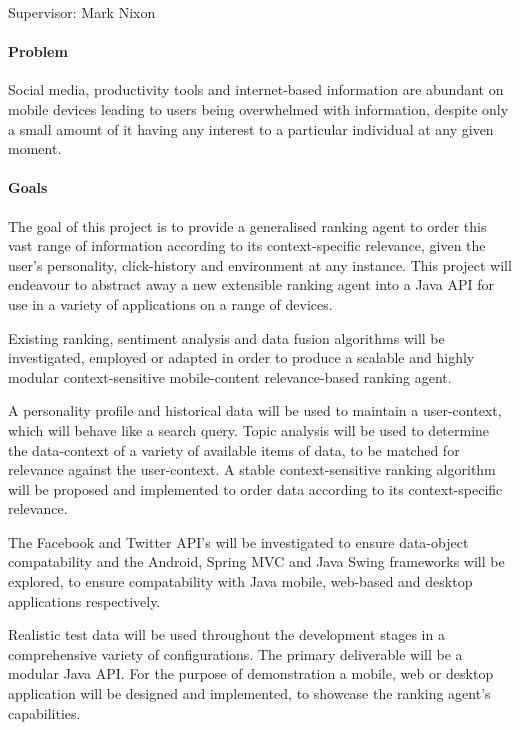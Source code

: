 \documentclass[12pt]{article}
\begin{document}
\maketitle
Supervisor: Mark Nixon

\paragraph{Problem}
Social media, productivity tools and internet-based information are abundant on mobile devices leading to users being overwhelmed with information, despite only a small amount of it having any interest to a particular individual at any given moment.

\paragraph{Goals}
The goal of this project is to provide a generalised ranking agent to order this vast range of information according to its context-specific relevance, given the user's personality, click-history and environment at any instance. This project will endeavour to abstract away a new extensible ranking agent into a Java API for use in a variety of applications on a range of devices.

Existing ranking, sentiment analysis and data fusion algorithms will be investigated, employed or adapted in order to produce a scalable and highly modular context-sensitive mobile-content relevance-based ranking agent.

 A personality profile and historical data will be used to maintain a user-context, which will behave like a search query. Topic analysis will be used to determine the data-context of a variety of available items of data, to be matched for relevance against the user-context. A stable context-sensitive ranking algorithm will be proposed and implemented to order data according to its context-specific relevance.

The Facebook and Twitter API's will be investigated to ensure data-object compatability and the Android, Spring MVC and Java Swing frameworks will be explored, to ensure compatability with Java mobile, web-based and desktop applications respectively. 

Realistic test data will be used throughout the development stages in a comprehensive variety of configurations. 
The primary deliverable will be a modular Java API. For the purpose of demonstration a mobile, web or desktop application will be designed and implemented, to showcase the ranking agent's capabilities. 
\end{document}
